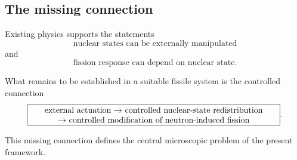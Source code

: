 \subsection{The missing connection}

Existing physics supports the statements
\begin{equation}
\boxed{\text{nuclear states can be externally manipulated}}
\end{equation}
and
\begin{equation}
\boxed{\text{fission response can depend on nuclear state}}.
\end{equation}

What remains to be established in a suitable fissile system is the controlled connection
\begin{equation}
\boxed{
\begin{minipage}{0.86\columnwidth}
\centering
external actuation $\rightarrow$ controlled nuclear-state redistribution\\
$\rightarrow$ controlled modification of neutron-induced fission
\end{minipage}
}.
\end{equation}

This missing connection defines the central microscopic problem of the present framework.
